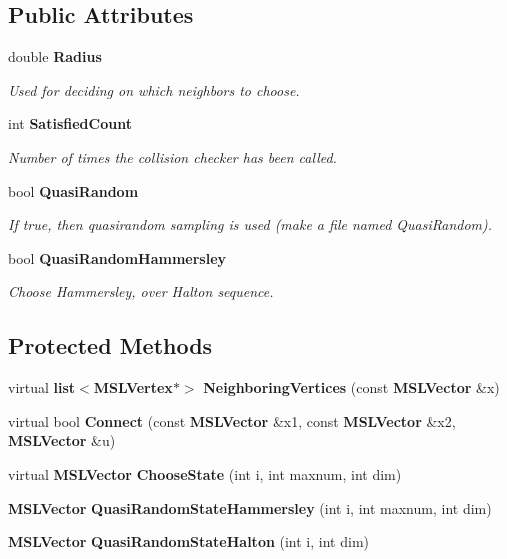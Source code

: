 \subsection*{Public Attributes}
\begin{CompactItemize}
\item 
double {\bf Radius}
\begin{CompactList}\small\item\em Used for deciding on which neighbors to choose.\item\end{CompactList}\item 
int {\bf Satisfied\-Count}
\begin{CompactList}\small\item\em Number of times the collision checker has been called.\item\end{CompactList}\item 
bool {\bf Quasi\-Random}
\begin{CompactList}\small\item\em If true, then quasirandom sampling is used (make a file named Quasi\-Random).\item\end{CompactList}\item 
bool {\bf Quasi\-Random\-Hammersley}
\begin{CompactList}\small\item\em Choose Hammersley, over Halton sequence.\item\end{CompactList}\end{CompactItemize}
\subsection*{Protected Methods}
\begin{CompactItemize}
\item 
virtual {\bf list}$<${\bf MSLVertex}$\ast$$>$ {\bf Neighboring\-Vertices} (const {\bf MSLVector} \&x)
\item 
virtual bool {\bf Connect} (const {\bf MSLVector} \&x1, const {\bf MSLVector} \&x2, {\bf MSLVector} \&u)
\item 
virtual {\bf MSLVector} {\bf Choose\-State} (int i, int maxnum, int dim)
\item 
{\bf MSLVector} {\bf Quasi\-Random\-State\-Hammersley} (int i, int maxnum, int dim)
\item 
{\bf MSLVector} {\bf Quasi\-Random\-State\-Halton} (int i, int dim)
\end{CompactItemize}
